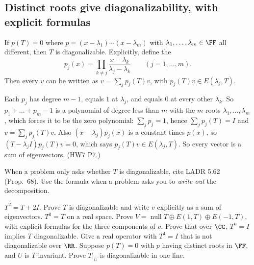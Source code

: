 \documentclass[10pt]{scrartcl}
\DeclareMathOperator{\nul}{null}
\begin{document}
\subsection{Distinct roots give diagonalizability, with explicit formulas}
\begin{theorem*}[T2]
  If $p(T)=0$ where $p=(x-\lambda_1)\cdots(x-\lambda_m)$ with $\lambda_1,\dots,\lambda_m\in\FF$ all different, then $T$ is diagonalizable. Explicitly, define the 
  \[ p_j(x)=\prod_{k\ne j}\frac{x-\lambda_k}{\lambda_j-\lambda_k}\qquad(j=1,\dots,m). \]
  Then every $v$ can be written as $v=\sum_jp_j(T)v$, with $p_j(T)v\in E(\lambda_j,T)$.
\end{theorem*}
\why Each $p_j$ has degree $m-1$, equals $1$ at $\lambda_j$, and equals $0$ at every other $\lambda_k$. So $p_1+\dots+p_m-1$ is a polynomial of degree less than $m$ with the $m$ roots $\lambda_1,\dots,\lambda_m$, which forces it to be the zero polynomial: $\sum_jp_j=1$, hence $\sum_jp_j(T)=I$ and $v=\sum_jp_j(T)v$. Also $(x-\lambda_j)p_j(x)$ is a constant times $p(x)$, so $(T-\lambda_jI)p_j(T)v=0$, which says $p_j(T)v\in E(\lambda_j,T)$. So every vector is a sum of eigenvectors. (HW7 P7.)

When a problem only asks whether $T$ is diagonalizable, cite LADR 5.62 (Prop.~68). Use the formula when a problem asks you to \emph{write out} the decomposition.
\probs
\begin{enumerate}[(a)]
  \ii $T^2=T+2I$. Prove $T$ is diagonalizable and write $v$ explicitly as a sum of eigenvectors.
  \ii $T^3=T$ on a real space. Prove $V=\nul T\oplus E(1,T)\oplus E(-1,T)$, with explicit formulas for the three components of $v$.
  \ii Prove that over $\CC$, $T^n=I$ implies $T$ diagonalizable. Give a real operator with $T^4=I$ that is not diagonalizable over $\RR$.
  \ii Suppose $p(T)=0$ with $p$ having distinct roots in $\FF$, and $U$ is $T$-invariant. Prove $T|_U$ is diagonalizable in one line.
\end{enumerate}
\end{document}
